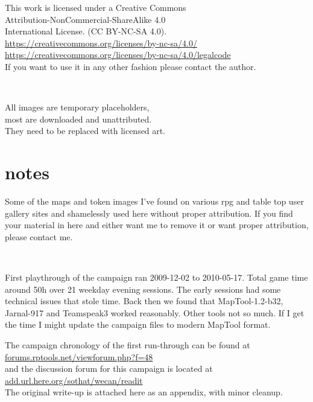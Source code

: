 
\raggedbottom


\thispagestyle{empty} %

\vsmall
\noindent 
This work is licensed under a Creative Commons \\
Attribution-NonCommercial-ShareAlike 4.0 \\
International License. (CC BY-NC-SA 4.0).\\
\url{https://creativecommons.org/licenses/by-nc-sa/4.0/} \\
\url{https://creativecommons.org/licenses/by-nc-sa/4.0/legalcode} \\
If you want to use it in any other fashion please contact the author.

\

\noindent
All images are temporary placeholders, \\
most are downloaded and unattributed.\\
They need to be replaced with licensed art.

\normalsize




\vfill

\section*{notes}

Some of the maps and token images I've found on various rpg and table top user gallery sites and shamelessly used here without proper attribution. If you find your material in here and either want me to remove it or want proper attribution, please contact me.

\

First playthrough of the campaign ran 2009-12-02 to 2010-05-17. Total game time around 50h over 21 weekday evening sessions. 
The early sessions had some technical issues that stole time. Back then we found that MapTool-1.2-b32, Jarnal-917 and Teamspeak3 worked reasonably. Other tools not so much. If I get the time I might update the campaign files to modern MapTool format.

\noindent The campaign chronology of the first run-through can be found at \\
\url{forums.rptools.net/viewforum.php?f=48} \\
and the discussion forum for this campaign is located at \\
\url{add.url.here.org/sothat/wecan/readit} \\
The original write-up is attached here as an appendix, with minor cleanup.

